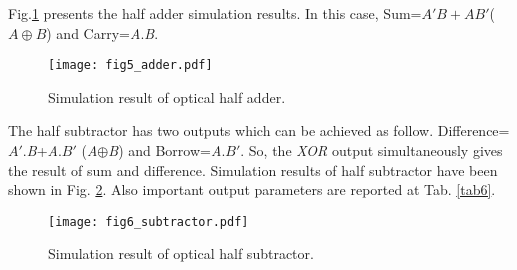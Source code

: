 \documentclass{osa-article}
\begin{document}
\begin{table}[H]
\caption{The parameters of flower-like structure  as optical half adder.}
\centering 
{}
\label{tab5} %
\end{table}

Fig.\ref{fig5_adder} presents the half adder simulation results. In this case, Sum=$A'B+AB'$($A\oplus B$) and Carry=\textit {A}.\textit {B}.
   \begin{figure}[tb]
\centering
\texttt{[image: fig5\_adder.pdf]}
	\caption{Simulation result of optical half adder.}
	\label{fig5_adder}
\end{figure}

The half subtractor has two outputs which can be achieved as follow. Difference=$A'$.\textit {B}+\textit {A}.$B'$ (\textit {A}$\oplus$\textit {B}) and Borrow=\textit {A}.$B'$. So, the \textit{XOR} output simultaneously gives the result of sum and difference. Simulation results of half subtractor have been shown in Fig. \ref{fig6_subtractor}. Also important output parameters are reported at Tab. \ref{tab6}.
   \begin{figure}[tb]
\centering
\texttt{[image: fig6\_subtractor.pdf]}
	\caption{Simulation result of optical half subtractor.}
	\label{fig6_subtractor}
\end{figure}
\end{document}
